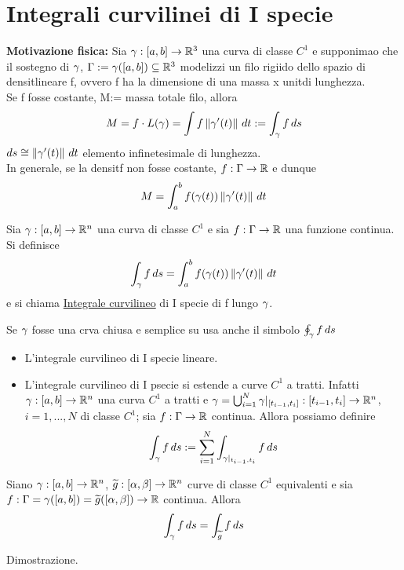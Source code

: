 \section{Integrali curvilinei di I specie}
\textbf{Motivazione fisica:} Sia $\gamma:[a,b]\to\mathbb{R}^3$ una curva di classe $C^1$ e supponimao che 
il sostegno di $\gamma$, $\Gamma:= \gamma([a,b])\subseteq\mathbb{R}^3$ modelizzi 
un filo rigiido dello spazio di densit\aca lineare f, ovvero f ha la dimensione di una 
massa x unit\aca di lunghezza.\\
Se f fosse costante, M:= massa totale filo, allora
$$M = f\cdot L(\gamma) = \int f\left\lVert\gamma'(t)\right\rVert\,dt := \int_{\gamma} f \,ds$$
$ds \cong \left\lVert\gamma'(t)\right\rVert \,dt$ elemento infinetesimale di lunghezza.\\
In generale, se la densit\aca f non fosse costante, $f:\Gamma \to \mathbb{R}$ e dunque 
$$M =\int_{a}^{b} f(\gamma(t)) \left\lVert\gamma'(t)\right\rVert\,dt$$
\begin{definition}
  Sia $\gamma : [a,b]\to\mathbb{R}^n$ una curva di classe $C^1$ e sia $f:\Gamma \to \mathbb{R}$
  una funzione continua. Si definisce
  $$\int_{\gamma} f \,ds = \int_{a}^{b} f(\gamma(t))\left\lVert\gamma'(t)\right\rVert \,dt$$
  e si chiama \underline{Integrale curvilineo} di I specie di f lungo $\gamma$.
\end{definition}
\begin{notazione}
  Se $\gamma$ fosse una crva chiusa e semplice su usa anche il simbolo $\oint_{\gamma}f\,ds$
\end{notazione}
\begin{osservazione}
  \begin{itemize}
    \item L'integrale curvilineo di I specie \ace lineare.
    \item L'integrale curvilineo di I psecie si estende a curve $C^1$ a tratti. Infatti
          $\gamma:[a,b]\to\mathbb{R}^n$ una curva $C^1$ a tratti e
          $\gamma = \bigcup_{i=1}^{N} \gamma|_{[t_{i-1},t_i]} : [t_{i-1},t_i] \to\mathbb{R}^n$, $i = 1,...,N$ di classe 
          $C^1$; sia $f:\Gamma \to \mathbb{R}$ continua. Allora possiamo definire
          $$\int_{\gamma}f\,ds:=\sum_{i=1}^{N}\int_{\gamma|_{t_{i-1},t_i}} f \,ds$$
  \end{itemize}
\end{osservazione}
\begin{proposition}
  Siano $\gamma:[a,b]\to\mathbb{R}^n$, $\widetilde{g}:[\alpha,\beta]\to\mathbb{R}^n$ curve di classe $C^1$
  equivalenti e sia $f:\Gamma = \gamma([a,b]) = \widetilde{g}([\alpha,\beta]) \to \mathbb{R}$ continua. 
  Allora $$\int_{\gamma} f\,ds = \int_{\widetilde{g}} f \,ds$$
  \begin{exercise}
    Dimostrazione.
  \end{exercise}
\end{proposition}
